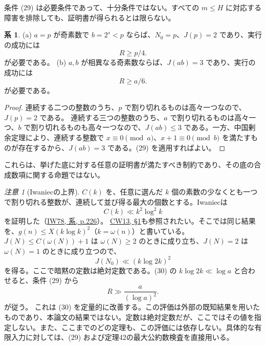 \documentclass[11pt,reqno]{amsart}
\theoremstyle{definition}
\newtheorem{corollary}[theorem]{系}
\theoremstyle{definition}
\theoremstyle{remark}
\newtheorem*{remark}{注意}
\begin{document}
条件 (29) は必要条件であって、十分条件ではない。すべての \(m\le H\) に対応する障害を排除しても、証明書が得られるとは限らない。

\begin{samepage}
\begin{corollary}\leavevmode\label{thm:45}
(a) \(a=p\) が奇素数で \(b=2^s<p\) ならば、\(N_0=p\)、\(J(p)=2\) であり、実行の成功には
\[
R\ge p/4.
\]
が必要である。
(b) \(a,b\) が相異なる奇素数ならば、\(J(ab)=3\) であり、実行の成功には
\[
R\ge a/6.
\]
が必要である。
\label{thm-end:45}
\end{corollary}
\end{samepage}

\begin{proof}\leavevmode\label{proof:45}
連続する二つの整数のうち、\(p\) で割り切れるものは高々一つなので、\(J(p)=2\) である。
連続する三つの整数のうち、\(a\) で割り切れるものは高々一つ、\(b\) で割り切れるものも高々一つなので、\(J(ab)\le3\) である。一方、中国剰余定理により、連続する整数で \(x\equiv0\pmod a\)、\(x+1\equiv0\pmod b\) を満たすものが存在するから、\(J(ab)=3\) である。(29) を適用すればよい。\qedhere
\end{proof}

これらは、挙げた底に対する任意の証明書が満たすべき制約であり、その底の合成数項に関する命題ではない。

\begin{remark}[Iwaniecの上界]
\(C(k)\) を、任意に選んだ \(k\) 個の素数の少なくとも一つで割り切れる整数が、連続して並び得る最大の個数とする。Iwaniecは
\[
C(k)\ll k^2\log^2k
\]
を証明した（\hyperref[ref-iw78]{IW78, 系, p.226}）。
\hyperref[ref-cw13]{CW13, §1}も参照されたい。そこでは同じ結果を、\(g(n)\le X(k\log k)^2\)（\(k=\omega(n)\)）と書いている。
\(J(N)\le C(\omega(N))+1\) は \(\omega(N)\ge2\) のときに成り立ち、\(J(N)=2\) は \(\omega(N)=1\) のときに成り立つので、
\[
J(N_0)\ll(k\log2k)^2
\]
を得る。ここで暗黙の定数は絶対定数である。(30) の \(k\log2k\ll\log a\) と合わせると、条件 (29) から
\[
R\gg\frac{a}{(\log a)^2}.
\]
が従う。
これは (30) を定量的に改善する。この評価は外部の既知結果を用いたものであり、本論文の結果ではない。定数は絶対定数だが、ここではその値を指定しない。また、ここまでのどの定理も、この評価には依存しない。具体的な有限入力に対しては、(29) および定理42の最大公約数検査を直接用いる。
\end{remark}
\end{document}
